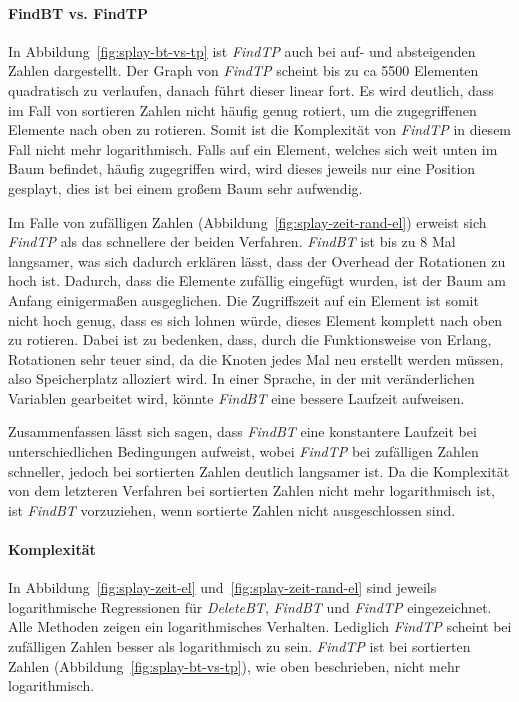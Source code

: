 \paragraph{FindBT vs. FindTP}
In Abbildung~\ref{fig:splay-bt-vs-tp} ist \textit{FindTP} auch bei auf- und absteigenden Zahlen
dargestellt.
Der Graph von \textit{FindTP} scheint bis zu ca 5500 Elementen quadratisch zu verlaufen, danach
führt dieser linear fort.
Es wird deutlich, dass im Fall von sortieren Zahlen nicht häufig genug rotiert, um
die zugegriffenen Elemente nach oben zu rotieren.
Somit ist die Komplexität von \textit{FindTP} in diesem Fall nicht mehr logarithmisch.
Falls auf ein Element, welches sich weit unten im Baum befindet, häufig zugegriffen wird, wird
dieses jeweils nur eine Position gesplayt, dies ist bei einem großem Baum sehr aufwendig.

Im Falle von zufälligen Zahlen (Abbildung~\ref{fig:splay-zeit-rand-el}) erweist sich \textit{FindTP}
als das schnellere der beiden Verfahren.
\textit{FindBT} ist bis zu 8 Mal langsamer, was sich dadurch erklären lässt, dass der Overhead
der Rotationen zu hoch ist.
Dadurch, dass die Elemente zufällig eingefügt wurden, ist der Baum am Anfang einigermaßen
ausgeglichen.
Die Zugriffszeit auf ein Element ist somit nicht hoch genug, dass es sich lohnen würde,
dieses Element komplett nach oben zu rotieren.
Dabei ist zu bedenken, dass, durch die Funktionsweise von Erlang, Rotationen sehr teuer sind, da
die Knoten jedes Mal neu erstellt werden müssen, also Speicherplatz alloziert wird.
In einer Sprache, in der mit veränderlichen Variablen gearbeitet wird, könnte \textit{FindBT}
eine bessere Laufzeit aufweisen.

Zusammenfassen lässt sich sagen, dass \textit{FindBT} eine konstantere Laufzeit bei
unterschiedlichen Bedingungen aufweist, wobei \textit{FindTP} bei zufälligen Zahlen
schneller, jedoch bei sortierten Zahlen deutlich langsamer ist.
Da die Komplexität von dem letzteren Verfahren bei sortierten Zahlen nicht mehr
logarithmisch ist, ist \textit{FindBT} vorzuziehen, wenn sortierte Zahlen nicht ausgeschlossen sind.


\paragraph{Komplexität}
In Abbildung~\ref{fig:splay-zeit-el} und~\ref{fig:splay-zeit-rand-el} sind jeweils
logarithmische Regressionen für \textit{DeleteBT}, \textit{FindBT} und \textit{FindTP} eingezeichnet.
Alle Methoden zeigen ein logarithmisches Verhalten.
Lediglich \textit{FindTP} scheint bei zufälligen Zahlen besser als logarithmisch zu sein.
\textit{FindTP} ist bei sortierten Zahlen (Abbildung~\ref{fig:splay-bt-vs-tp}), wie oben
beschrieben, nicht mehr logarithmisch.


